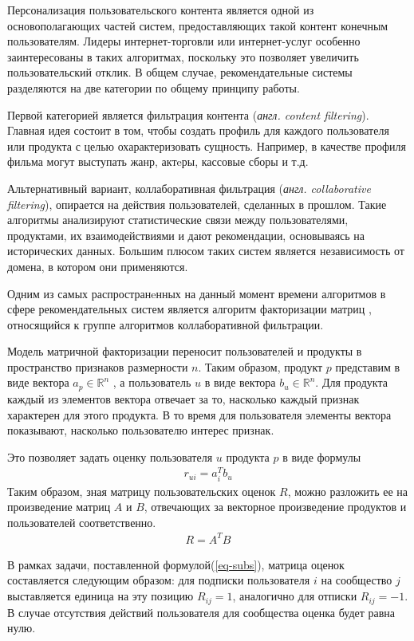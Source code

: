 \documentclass[times,specification,annotation]{itmo-student-thesis}
\begin{document}
Персонализация пользовательского контента является одной из основополагающих частей систем, предоставляющих такой контент конечным пользователям. Лидеры интернет-торговли или интернет-услуг особенно заинтересованы в таких алгоритмах, поскольку это позволяет увеличить пользовательский отклик.
В общем случае, рекомендательные системы разделяются на две категории по общему принципу работы.
  
Первой категорией является фильтрация контента (\textit{англ. content filtering})\cite{Lops2011}. Главная идея состоит в том, чтобы создать профиль для каждого пользователя или продукта с целью охарактеризовать сущность. Например, в качестве профиля фильма могут выступать жанр, актeры, кассовые сборы и т.д.

Альтернативный вариант, коллаборативная фильтрация (\textit{англ. collaborative filtering}), опирается на действия пользователей, сделанных в прошлом. Такие алгоритмы анализируют статистические связи между пользователями, продуктами, их взаимодействиями и дают рекомендации, основываясь на исторических данных.  Большим плюсом таких систем является независимость от домена, в котором они применяются.

Одним из самых распространeнных на данный момент времени алгоритмов в сфере рекомендательных систем является алгоритм факторизации матриц \cite{koren2009}, относящийся к группе алгоритмов коллаборативной фильтрации.

Модель матричной факторизации переносит пользователей и продукты в пространство признаков размерности $n$. Таким образом, продукт $p$ представим в виде вектора $a_{p} \in \mathbb{R}^n$ , а пользователь $u$ в виде вектора $b_{u} \in \mathbb{R}^n$. Для продукта каждый из элементов вектора отвечает за то, насколько каждый признак характерен для  этого продукта. В то время для пользователя элементы вектора показывают, насколько пользователю интерес признак.

Это позволяет задать оценку пользователя $u$ продукта $p$ в виде формулы
 \begin{align*}
r_{ui} = a_{i}^{T}b_{u}
\end{align*}
Таким образом, зная матрицу пользовательских оценок $R$, можно разложить ее на произведение матриц $A$ и $B$, отвечающих за векторное произведение продуктов и пользователей соответственно.
 \begin{align*}
R = A^TB
\end{align*}

В рамках задачи, поставленной формулой(\ref{eq-subs}), матрица оценок составляется следующим образом: для подписки пользователя $i$ на сообщество $j$ выставляется единица на эту позицию $R_{ij} = 1$, аналогично для отписки $R_{ij} = - 1$. В случае отсутствия действий пользователя для сообщества оценка будет равна нулю.
\end{document}
